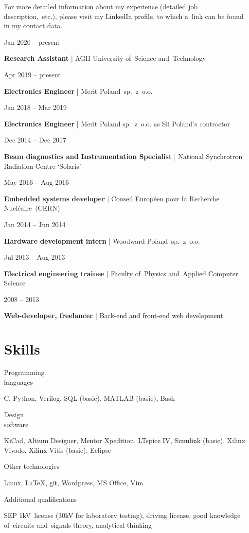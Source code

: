 \documentclass[11pt,a4paper,sans]{article}
\newcommand{\cvexpdateslimitem}[3]{
	
	\noindent
	\begin{minipage}[t]{0.22\linewidth}
		#1
	\end{minipage}
	\hfill
	\begin{minipage}[t]{0.76\linewidth}
		\begin{flushleft}
			{\bfseries #2} | #3
		\end{flushleft}
	\end{minipage}
	\vspace{.5\baselineskip}
	
}
\newcommand{\cvskillsitem}[2]{
	
	\noindent
	\begin{minipage}{0.21\linewidth}
		\begin{flushleft}
			#1
		\end{flushleft}
	\end{minipage}
	\hfill
	\begin{minipage}{0.766\linewidth}
		
		\begin{flushleft}
			#2
		\end{flushleft}
	\end{minipage}
	\vspace{.65\baselineskip}
}
\begin{document}
	For more detailed information about my experience (detailed job
	description,~etc.), please visit my LinkedIn profile, to which a~link can
	be found in my contact data.
	\vspace{1\baselineskip}

	\cvexpdateslimitem
		{Jan 2020 -- present}
		{Research Assistant}
		{AGH University of~Science and~Technology}

	\cvexpdateslimitem
		{Apr 2019 -- present}
		{Electronics Engineer}
		{Merit Poland~sp.~z~o.o.}
		
	\cvexpdateslimitem
		{Jan 2018 -- Mar 2019}
		{Electronics Engineer}
		{Merit Poland sp.~z~o.o. as Sii Poland's contractor}
		
	\cvexpdateslimitem
		{Dec 2014 -- Dec 2017}
		{Beam diagnostics and Instrumentation Specialist}
		{National Synchrotron Radiation Centre `Solaris'}
	
	\cvexpdateslimitem
		{May 2016 -- Aug 2016}
		{Embedded systems developer}
		{Conseil Européen pour la Recherche Nucléaire~(CERN)}
	
	\cvexpdateslimitem
		{Jan 2014 -- Jun 2014}
		{Hardware development intern}
		{Woodward Poland~sp.~z~o.o.}
	
	\cvexpdateslimitem
		{Jul 2013 -- Aug 2013}
		{Electrical engineering trainee}
		{Faculty of~Physics	and~Applied Computer Science}
	
	\cvexpdateslimitem
		{2008 -- 2013}
		{Web-developer, freelancer}
		{Back-end and front-end web development}
	
	\section{Skills}
	\cvskillsitem
	{Programming\\languages}
	{C, Python, Verilog, SQL (basic), MATLAB (basic),
	Bash}
	
	\cvskillsitem
	{Design\\software}
	{KiCad, Altium Designer, Mentor Xpedition, LTspice IV, Simulink (basic), Xilinx
	Vivado, Xilinx Vitis (basic), Eclipse}
	
	\cvskillsitem
	{Other technologies}
	{Linux, \LaTeX, git, Wordpress, MS Office, Vim}
	
	\cvskillsitem
	{Additional qualifications}
	{SEP 1\hspace{3pt}kV~license (30\hspace{3pt}kV for laboratory testing), 
	driving license, good knowledge of~circuits and~signals theory, 
	analytical thinking}
	
\end{document}
